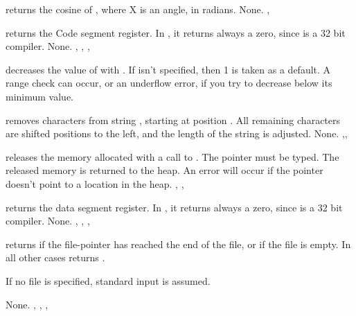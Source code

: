 \documentclass{report}
\begin{document}


{ returns the cosine of , where X is an angle, in radians.}
{None.}
{, }



{ returns the Code segment register. In \fpc, it returns always a
zero, since \fpc is a 32 bit compiler.}
{None.}
{, , , }



{ decreases the value of  with .
If  isn't specified, then 1 is taken as a default.}
{A range check can occur, or an underflow error, if you try to decrease 
below its minimum value.}
{}



{ removes  characters from string , starting
at position . All remaining characters are shifted  
positions to the left, and the length of the string is adjusted.
}
{None.}
{,,}



{ releases the memory allocated with a call to .
The pointer  must be typed. The released memory is returned to the
heap.}
{An error will occur if the pointer doesn't point to a location in the
heap.}
{, , }



{ returns the data segment register. In \fpc, it returns always a
zero, since \fpc is a 32 bit compiler.}
{None.}
{, , , }



{ returns  if the file-pointer has reached the end of the
file, or if the file is empty. In all other cases  returns
.

If no file  is specified, standard input is assumed.}
{None.}
{, , , }
\end{document}

